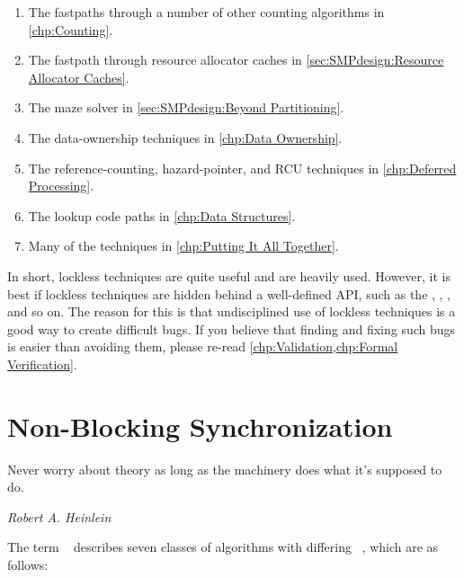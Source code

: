 \begin{enumerate}
\item	The fastpaths through a number of other counting algorithms
	in \cref{chp:Counting}.
\item	The fastpath through resource allocator caches in
	\cref{sec:SMPdesign:Resource Allocator Caches}.
\item	The maze solver in \cref{sec:SMPdesign:Beyond Partitioning}.
\item	The data-ownership techniques in \cref{chp:Data Ownership}.
\item	The reference-counting, hazard-pointer, and RCU techniques
	in \cref{chp:Deferred Processing}.
\item	The lookup code paths in \cref{chp:Data Structures}.
\item	Many of the techniques in \cref{chp:Putting It All Together}.
\end{enumerate}

In short, lockless techniques are quite useful and are heavily used.
However, it is best if lockless techniques are hidden behind a
well-defined API, such as the , ,
, and so on.
The reason for this is that undisciplined use of lockless techniques
is a good way to create difficult bugs.
If you believe that finding and fixing such bugs is easier than avoiding
them, please re-read
\cref{chp:Validation,chp:Formal Verification}.

\section{Non-Blocking Synchronization}
\label{sec:advsync:Non-Blocking Synchronization}
%
\epigraph{Never worry about theory as long as the machinery does what
	  it's supposed to do.}
	 {\emph{Robert A. Heinlein}}

The term ~\cite{MauriceHerlihy90a}
describes seven classes of  algorithms with differing
\emph{}~\cite{DanAlitarh2013PracticalProgress},
which are as follows:

